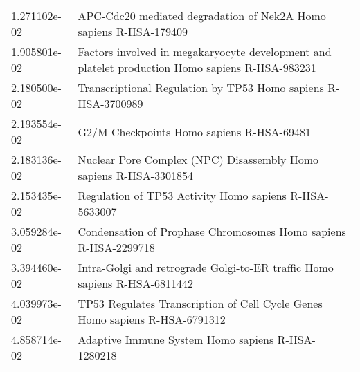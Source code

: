\begin{longtable}{p{2.4cm}p{14.5cm}}
             1.271102e-02 &                                                                                      APC-Cdc20 mediated degradation of Nek2A Homo sapiens R-HSA-179409 \\
             1.905801e-02 &                                                        Factors involved in megakaryocyte development and platelet production Homo sapiens R-HSA-983231 \\
             2.180500e-02 &                                                                                          Transcriptional Regulation by TP53 Homo sapiens R-HSA-3700989 \\
             2.193554e-02 &                                                                                                              G2/M Checkpoints Homo sapiens R-HSA-69481 \\
             2.183136e-02 &                                                                                      Nuclear Pore Complex (NPC) Disassembly Homo sapiens R-HSA-3301854 \\
             2.153435e-02 &                                                                                                 Regulation of TP53 Activity Homo sapiens R-HSA-5633007 \\
             3.059284e-02 &                                                                                        Condensation of Prophase Chromosomes Homo sapiens R-HSA-2299718 \\
             3.394460e-02 &                                                                              Intra-Golgi and retrograde Golgi-to-ER traffic Homo sapiens R-HSA-6811442 \\
             4.039973e-02 &                                                                            TP53 Regulates Transcription of Cell Cycle Genes Homo sapiens R-HSA-6791312 \\
             4.858714e-02 &                                                                                                      Adaptive Immune System Homo sapiens R-HSA-1280218 \\
\end{longtable}


